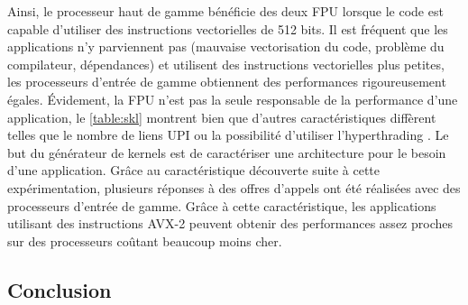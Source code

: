         
        
       Ainsi, le processeur haut de gamme bénéficie des deux FPU lorsque le code est capable d'utiliser des instructions vectorielles de 512 bits. Il est fréquent que les applications n'y parviennent pas (mauvaise vectorisation du code, problème du compilateur, dépendances) et utilisent des instructions vectorielles plus petites, les processeurs d'entrée de gamme obtiennent des performances rigoureusement égales. Évidement, la FPU n'est pas la seule responsable de la performance d'une application, le \autoref{table:skl} montrent bien que d'autres caractéristiques diffèrent telles que le nombre de liens UPI ou la possibilité d'utiliser l'hyperthrading . Le but du générateur de kernels est de caractériser une architecture pour le besoin d'une application. Grâce au caractéristique découverte suite à cette expérimentation, plusieurs réponses à des offres d'appels ont été réalisées avec des processeurs d'entrée de gamme. Grâce à cette caractéristique, les applications utilisant des instructions AVX-2 peuvent obtenir des performances assez proches sur des processeurs coûtant beaucoup moins cher.


        
        




    
    


\subsection{Conclusion}
    
